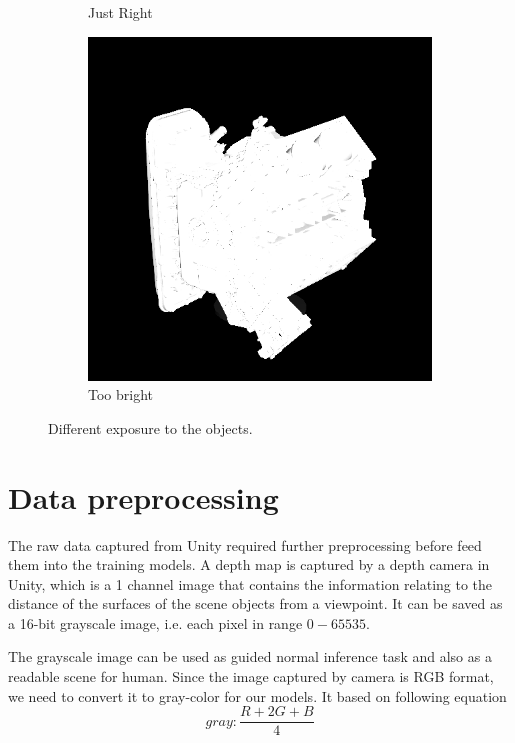 \begin{figure}[H]
\begin{subfigure}[b]{0.32\linewidth}
		\caption{Just Right}
	\end{subfigure}
	\begin{subfigure}[b]{0.32\linewidth}
		\includegraphics[width=\textwidth]{./Figures/wrong_exposure.png}
		\caption{Too bright}
	\end{subfigure}
	\decoRule
	\caption{Different exposure to the objects.}
	\label{fig:camera_exposure}
\end{figure}




\section{Data preprocessing}
The raw data captured from Unity required further preprocessing before feed them into the training models. 
A depth map is captured by a depth camera in Unity, which is a 1 channel image that contains the information relating to the distance of the surfaces of the scene objects from a viewpoint. It can be saved as a 16-bit grayscale image, i.e. each pixel in range $0 - 65535$. 

The grayscale image can be used as guided normal inference task and also as a readable scene for human. Since the image captured by camera is RGB format, we need to convert it to gray-color for our models. It based on following equation
\[ gray: \frac{R+2G+B}{4}  \]

